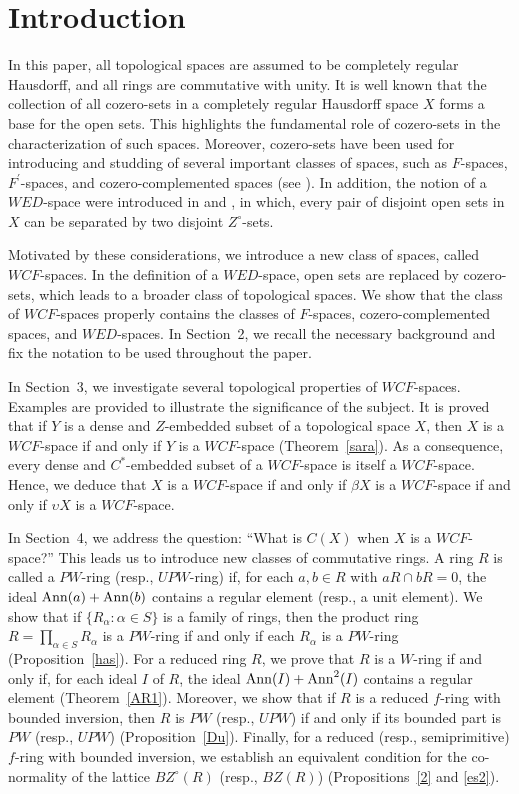 \documentclass{amsart}
\theoremstyle{definition}
\theoremstyle{remark}
\numberwithin{equation}{section}
\newcommand{\Ann}{{\rm Ann}}
\theoremstyle{definition}\newtheorem{thm}{Theorem}[section]
\theoremstyle{definition}\newtheorem{cor}[thm]{Corollary}
\theoremstyle{definition}\newtheorem{lem}[thm]{Lemma}
\theoremstyle{definition}\newtheorem{prop}[thm]{Proposition}
\theoremstyle{definition}\newtheorem{defn}[thm]{Definition}
\theoremstyle{definition}\newtheorem{Rem}[thm]{Remark}
\theoremstyle{remark}\newtheorem{rem}[thm]{Remark}
\theoremstyle{definition}\newtheorem{exam}[thm]{Example}
\theoremstyle{definition}\newtheorem{qu}[thm]{question}
\begin{document}
\section{Introduction}
In this paper, all topological spaces are assumed to be completely regular Hausdorff, and all rings are commutative with unity.  
It is well known that the collection of all cozero-sets in a completely regular Hausdorff space $X$ forms a base for the open sets.  
This highlights the fundamental role of cozero-sets in the characterization of such spaces.  
Moreover, cozero-sets have been used for introducing and studding of several important classes of spaces, such as $F$-spaces, $F^{\prime}$-spaces, and cozero-complemented spaces (see \cite{GJ, GM, GME, NH, HW, HVW}).  
 In addition, the notion of a $WED$-space were introduced in \cite{AT} and \cite{DT},   
in which, every pair of disjoint open sets in $X$ can be separated by two disjoint $Z^{\circ}$-sets.  

Motivated by these considerations, we introduce a new class of spaces, called $WCF$-spaces. In the definition of a $WED$-space, open sets are replaced by cozero-sets, which leads to a broader class of topological spaces. We show that the class of $WCF$-spaces properly contains the classes of $F$-spaces, cozero-complemented spaces, and $WED$-spaces. In Section~2, we recall the necessary background and fix the notation to be used throughout the paper.

In Section~3, we investigate several topological properties of $WCF$-spaces. Examples are provided to illustrate the significance of the subject. It is proved that if $Y$ is a dense and $Z$-embedded subset of a topological space $X$, then $X$ is a $WCF$-space if and only if $Y$ is a $WCF$-space (Theorem~\ref{sara}). As a consequence, every dense and $C^{*}$-embedded subset of a $WCF$-space is itself a $WCF$-space. Hence, we deduce that $X$ is a $WCF$-space if and only if $\beta X$ is a $WCF$-space if and only if $\upsilon X$ is a $WCF$-space.  

In Section~4, we address the question: ``What is $C(X)$ when $X$ is a $WCF$-space?'' This leads us to introduce new classes of commutative rings. A ring $R$ is called a $PW$-ring (resp., $UPW$-ring) if, for each $a,b\in R$ with $aR\cap bR=0$, the ideal $\Ann(a)+\Ann(b)$ contains a regular element (resp., a unit element). We show that if $\{R_{\alpha} : \alpha \in S\}$ is a family of rings, then the product ring $R=\prod_{\alpha\in S} R_{\alpha}$ is a $PW$-ring if and only if each $R_{\alpha}$ is a $PW$-ring (Proposition~\ref{has}). For a reduced ring $R$, we prove that $R$ is a $W$-ring if and only if, for each ideal $I$ of $R$, the ideal $\Ann(I)+\Ann^{2}(I)$ contains a regular element (Theorem~\ref{AR1}). Moreover, we show that if $R$ is a reduced $f$-ring with bounded inversion, then $R$ is $PW$ (resp., $UPW$) if and only if its bounded part is $PW$ (resp., $UPW$) (Proposition~\ref{Du}). Finally, for a reduced (resp., semiprimitive) $f$-ring with bounded inversion, we establish an equivalent condition for the co-normality of the lattice $BZ^{\circ}(R)$ (resp., $BZ(R)$) (Propositions~\ref{2} and \ref{es2}).
 
\end{document}
